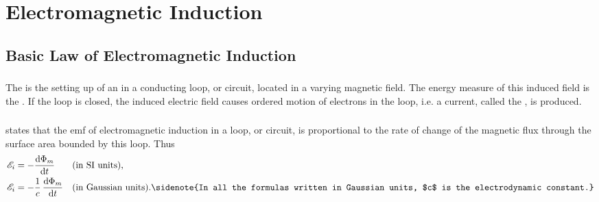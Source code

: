 





\chapter{Electromagnetic Induction}
\label{ch-25}

\section{Basic Law of Electromagnetic Induction}
\label{sec-25.1}

\subsection{}\label{25.1.1} The  is the setting up of an  in a conducting loop, or circuit, located in a varying magnetic field. The energy measure of this induced field is the . If the loop is closed, the induced electric field causes ordered motion of electrons in the loop, i.e. a current, called the , is produced.

\subsection{}\label{25.1.2}  states that the emf of electromagnetic induction in a loop, or circuit, is proportional to the rate of change of the magnetic flux  through the surface area bounded by this loop. Thus
\begin{align*}%
\emf_{i} & = - \dv{\Phi_{m}}{t} &&  \text{(in SI units),} \\
\emf_{i} & = - \frac{1}{c}\,\dv{\Phi_{m}}{t} &&  \text{(in Gaussian units).\sidenote{In all the formulas written in Gaussian units, $c$ is the electrodynamic constant.}}
\end{align*}



